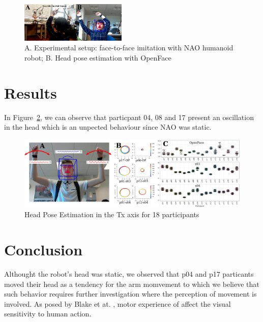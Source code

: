 \documentclass{sigchi}
\begin{document}
\begin{figure}[!htb]
\centering
\includegraphics[width=0.45\textwidth]{figures/experiment/fig_w619h233}
\caption[PA]{A. Experimental setup: face-to-face imitation with NAO humanoid robot;
B. Head pose estimation with OpenFace \cite{Baltrusaitis2016}
}
\label{fig:exp}
\end{figure}






\section{Results}

In Figure~\ref{fig:pose}, we can observe that particpant 04, 08 and 17
present an oscillation in the head which is an unpected behaviour since
NAO was static.

\begin{figure}[!htb]
\centering
\includegraphics[width=1.00\textwidth]{figures/results/main/figv01}
\caption[PA]{Head Pose Estimation in the Tx axis for 18 participants}
\label{fig:pose}
\end{figure}





\section{Conclusion}

Althought the robot's head was static, we observed that p04 and p17
particants moved their head as a tendency for the arm momvement to which
we believe that such behavior requires further investigation where
the perception of movement is involved. As posed by Blake et at.
\cite{blake2007}, motor experience of affect the visual sensitivity
to human action.
\end{document}
